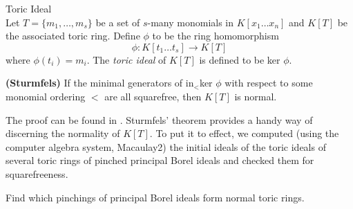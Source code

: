 \documentclass[a0, landscape]{a0poster}
\begin{document}
\begin{multicols}{4}
 
        

\begin{definition}{Toric Ideal}\label{Toric Ideal}\\
Let $T = \{m_1, \ldots, m_s\}$ be a set of $s$-many monomials in $K[x_1 \ldots x_n]$ and $K[T]$ be the associated toric ring. Define $\phi$ to be the ring homomorphism 
$$\phi: K[t_1 \ldots t_s] \to K[T]$$
where $\phi(t_i) = m_i$. The \emph{toric ideal} of $K[T]$ is defined to be ker $\phi$.
\end{definition}

\begin{theorem*}\textbf{(Sturmfels)}\cite{Sturmfels1996}\label{Sturmfels} If the minimal generators of in$_<$ker $\phi$ with respect to some monomial ordering $<$ are all squarefree, then $K[T]$ is normal. 
	
\end{theorem*}

The proof can be found in \citep{Ene}. Sturmfels' theorem provides a handy way of discerning the normality of $K[T]$. To put it to effect, we computed (using the computer algebra system, Macaulay2) the initial ideals of the toric ideals of several toric rings of pinched principal Borel ideals and checked them for squarefreeness. 

\begin{goal*}
	Find which pinchings of principal Borel ideals form normal toric rings.
\end{goal*}



\end{multicols}
\end{document}

